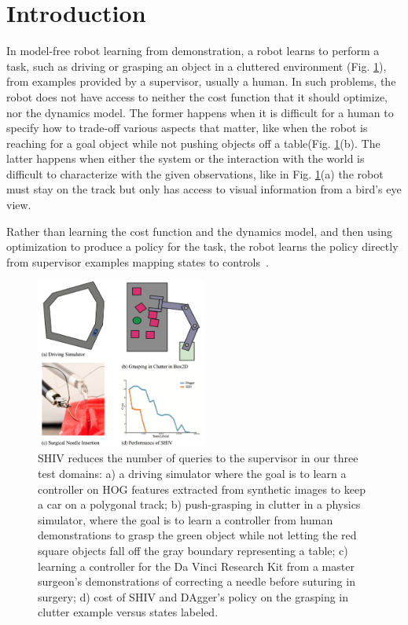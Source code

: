 \documentclass[10pt, conference]{ieeeconf}      %
\begin{document}

\section{Introduction} 


In model-free robot learning from demonstration, a robot learns to perform a task, such as driving or grasping an object in a cluttered environment (Fig. \ref{fig:teaser}), from examples provided by a  supervisor, usually a human.  In such problems, the robot does not have access to neither the cost function that it should optimize, nor the dynamics model. The former happens when it is difficult for a human to specify how to trade-off various aspects that matter, like when the robot is reaching for a goal object while not pushing objects off a table(Fig. \ref{fig:teaser}(b).  The latter happens when either the system or the interaction with the world is difficult to characterize with the given observations, like in Fig. \ref{fig:teaser}(a) the robot must stay on the track but only has access to visual information from a bird's eye view. 

Rather than learning the cost function and the dynamics model, and then using optimization to produce a policy for the task, the robot learns the policy directly from supervisor examples mapping states to controls~\cite{argall2009survey}.


\begin{figure}[ht]
\centering
   
\includegraphics[width=0.5\textwidth]{figures/teaser.pdf}
\caption{ 
SHIV  reduces the number of queries to the supervisor in our three test domains: a) a driving simulator where the goal is to learn a controller on HOG features extracted from synthetic images to keep a car on a polygonal track; b) push-grasping in clutter in a physics simulator, where the goal is to learn a controller from human demonstrations to grasp the green object while not letting the red square objects fall off the gray boundary representing a table; c) learning a controller for the Da Vinci Research Kit from a master surgeon's demonstrations of correcting a needle before suturing in surgery; d) cost of SHIV and DAgger's policy on the grasping in clutter example versus states labeled.
}
\vspace*{-10pt}
\label{fig:teaser}
\end{figure}
\end{document}
